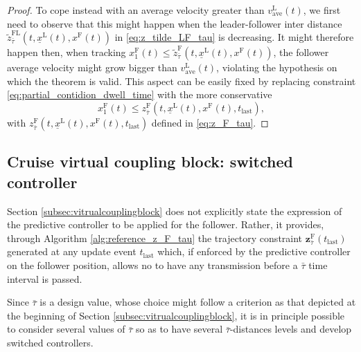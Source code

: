 \documentclass[letterpaper, 10 pt, conference]{ieeeconf}
\theoremstyle{definition}
\theoremstyle{nopoint}
\begin{document}
\begin{proof}
To cope instead with an average velocity greater than $v_{\mathrm{ave}}^\mathrm{L}(t)$, we first need to observe that this might happen when the leader-follower inter distance $\tilde{z}^{\mathrm{FL}}_{\bar{\tau}} (t,\underline{x}^\mathrm{L}(t),x^\mathrm{F}(t))$ in \eqref{eq:z_tilde_LF_tau} is decreasing. It might therefore happen then, when tracking $x_1^\mathrm{F}(t)\leq \tilde{z}^{\mathrm{F}}_{\bar{\tau}} (t,\underline{x}^\mathrm{L}(t),x^\mathrm{F}(t))$, the follower average velocity might grow bigger than $v_{\mathrm{ave}}^\mathrm{L}(t)$, violating the hypothesis on which the theorem is valid. This aspect can be easily fixed by replacing constraint \eqref{eq:partial_contidion_dwell_time} with the more conservative
\begin{equation}\label{eq:dwell_time}
x_1^\mathrm{F}(t)\leq z_{\bar{\tau}}^\mathrm{F}(t,\underline{x}^\mathrm{L}(t),x^\mathrm{F}(t),t_{\mathrm{last}}),
\end{equation}
with $z_{\bar{\tau}}^\mathrm{F}(t,\underline{x}^\mathrm{L}(t),x^\mathrm{F}(t),t_{\mathrm{last}})$ defined in \eqref{eq:z_F_tau}.
\end{proof}





\subsection{Cruise virtual coupling block: switched controller}
 \label{subsec:switchedvitrualcouplingblock}  

Section \ref{subsec:vitrualcouplingblock} does not explicitly state the expression of the predictive controller to be applied for the follower. Rather, it provides, through  Algorithm \ref{alg:reference_z_F_tau} the trajectory constraint $\mathbf{z}_{\bar{\tau}}^\mathrm{F}(t_{\mathrm{last}})$ generated at any update event $t_{\mathrm{last}}$ which, if enforced by the predictive controller on the follower position, allows no to have any transmission before a $\bar{\tau}$ time interval is passed. 

Since $\bar{\tau}$ is a design value, whose choice might follow a criterion as that depicted at the beginning of Section \ref{subsec:vitrualcouplingblock}, it is in principle possible to consider several values of $\bar{\tau}$ so as to have several $\bar{\tau}$-distances levels and develop switched controllers. 
\end{document}
